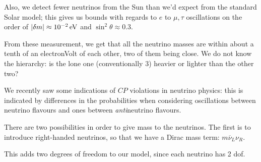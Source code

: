 \documentclass[main.tex]{subfiles}
\begin{document}
Also, we detect fewer neutrinos from the Sun than we'd expect from the standard Solar model; this gives us bounds with regards to \(e\) to \(\mu , \tau \) oscillations on the order of \(\abs{\delta m} \approx \SI{e-2}{eV}\) and \(\sin^2\theta \approx 0.3\).

From these measurement, we get that all the neutrino masses are within about a tenth of an electronVolt of each other, two of them being close.
We do not know the hierarchy: is the lone one (conventionally \(3\)) heavier or lighter than the other two?

We recently saw some indications of \(CP\) violations in neutrino physics: this is indicated by differences in the probabilities when considering oscillations between neutrino flavours and ones between \emph{anti}neutrino flavours.









There are two possibilities in order to give mass to the neutrinos. 
The first is to introduce right-handed neutrinos, so that we have a Dirac mass term: \(m \overline{\nu}_{L} \nu_{R}\). 

This adds two degrees of freedom to our model, since each neutrino has 2 dof. 
\end{document}
